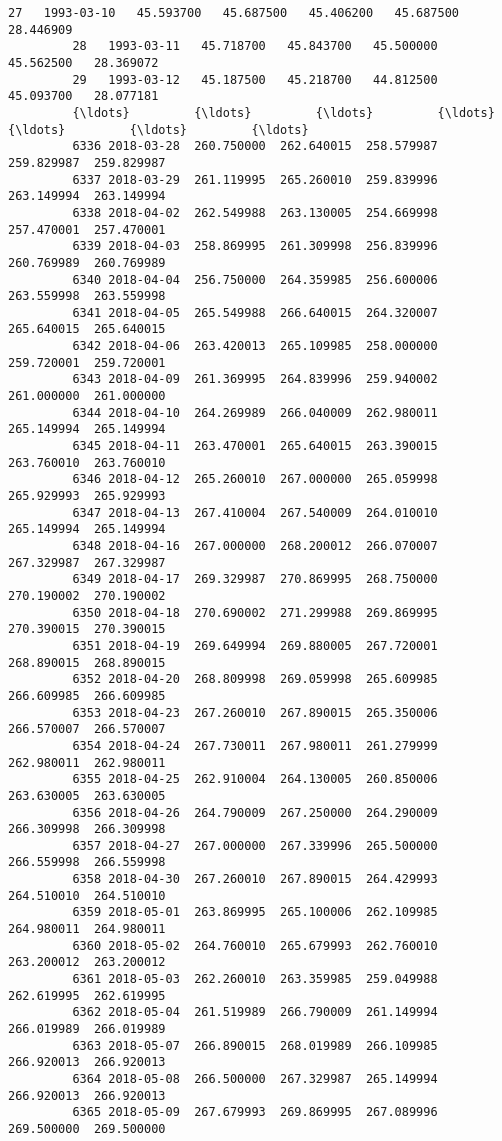 \documentclass[11pt]{article}
\begin{document}
\begin{Verbatim}[commandchars=\\\{\}]
         27   1993-03-10   45.593700   45.687500   45.406200   45.687500   28.446909   
         28   1993-03-11   45.718700   45.843700   45.500000   45.562500   28.369072   
         29   1993-03-12   45.187500   45.218700   44.812500   45.093700   28.077181   
         {\ldots}         {\ldots}         {\ldots}         {\ldots}         {\ldots}         {\ldots}         {\ldots}   
         6336 2018-03-28  260.750000  262.640015  258.579987  259.829987  259.829987   
         6337 2018-03-29  261.119995  265.260010  259.839996  263.149994  263.149994   
         6338 2018-04-02  262.549988  263.130005  254.669998  257.470001  257.470001   
         6339 2018-04-03  258.869995  261.309998  256.839996  260.769989  260.769989   
         6340 2018-04-04  256.750000  264.359985  256.600006  263.559998  263.559998   
         6341 2018-04-05  265.549988  266.640015  264.320007  265.640015  265.640015   
         6342 2018-04-06  263.420013  265.109985  258.000000  259.720001  259.720001   
         6343 2018-04-09  261.369995  264.839996  259.940002  261.000000  261.000000   
         6344 2018-04-10  264.269989  266.040009  262.980011  265.149994  265.149994   
         6345 2018-04-11  263.470001  265.640015  263.390015  263.760010  263.760010   
         6346 2018-04-12  265.260010  267.000000  265.059998  265.929993  265.929993   
         6347 2018-04-13  267.410004  267.540009  264.010010  265.149994  265.149994   
         6348 2018-04-16  267.000000  268.200012  266.070007  267.329987  267.329987   
         6349 2018-04-17  269.329987  270.869995  268.750000  270.190002  270.190002   
         6350 2018-04-18  270.690002  271.299988  269.869995  270.390015  270.390015   
         6351 2018-04-19  269.649994  269.880005  267.720001  268.890015  268.890015   
         6352 2018-04-20  268.809998  269.059998  265.609985  266.609985  266.609985   
         6353 2018-04-23  267.260010  267.890015  265.350006  266.570007  266.570007   
         6354 2018-04-24  267.730011  267.980011  261.279999  262.980011  262.980011   
         6355 2018-04-25  262.910004  264.130005  260.850006  263.630005  263.630005   
         6356 2018-04-26  264.790009  267.250000  264.290009  266.309998  266.309998   
         6357 2018-04-27  267.000000  267.339996  265.500000  266.559998  266.559998   
         6358 2018-04-30  267.260010  267.890015  264.429993  264.510010  264.510010   
         6359 2018-05-01  263.869995  265.100006  262.109985  264.980011  264.980011   
         6360 2018-05-02  264.760010  265.679993  262.760010  263.200012  263.200012   
         6361 2018-05-03  262.260010  263.359985  259.049988  262.619995  262.619995   
         6362 2018-05-04  261.519989  266.790009  261.149994  266.019989  266.019989   
         6363 2018-05-07  266.890015  268.019989  266.109985  266.920013  266.920013   
         6364 2018-05-08  266.500000  267.329987  265.149994  266.920013  266.920013   
         6365 2018-05-09  267.679993  269.869995  267.089996  269.500000  269.500000   
         

\end{Verbatim}
\end{document}
